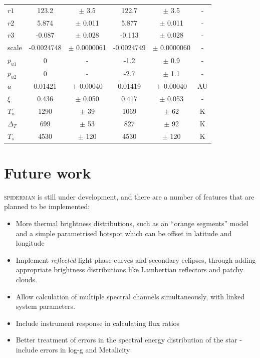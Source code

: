 \documentclass[a4paper,fleqn,usenatbib]{mnras}
\begin{document}
\begin{center}
\begin{table}
{\begin{center}
\begin{tabular}{l c c c c c}
$r1$ &        123.2 & $\pm$         3.5 &        122.7 & $\pm$         3.5 & -\\
$r2$ &        5.874 & $\pm$       0.011 &        5.877 & $\pm$       0.011 & -\\
$r3$ &       -0.087 & $\pm$       0.028 &       -0.113 & $\pm$       0.028 & -\\
scale &   -0.0024748 & $\pm$   0.0000061 &   -0.0024749 & $\pm$   0.0000060 & -\\
$p_{u1}$ & 0 & - &         -1.2 & $\pm$         0.9 & -\\
$p_{u2}$ & 0 & - &         -2.7 & $\pm$         1.1 & -\\
$a$ &      0.01421 & $\pm$     0.00040 &      0.01419 & $\pm$     0.00040 & AU\\
$\xi$ &        0.436 & $\pm$       0.050 &        0.417 & $\pm$       0.053 & -\\
$T_n$ &         1290 & $\pm$          39 &         1069 & $\pm$          62 & K\\
$\Delta_T$ &          699 & $\pm$          53 &          827 & $\pm$          92 & K\\
$T_s$ &         4530 & $\pm$         120 &         4530 & $\pm$         120 & K\\
\end{tabular}
\end{center}
\label{tab:results}
}
\end{table}
\end{center}

\section{Future work}\label{sec:future work}

\textsc{spiderman} is still under development, and there are a number of features that are planned to be implemented:

\begin{itemize}
\item More thermal brightness distributions, such as an ``orange segments'' model and a simple parametrised hotspot which can be offset in latitude and longitude
\item Implement \emph{reflected} light phase curves and secondary eclipses, through adding appropriate brightness distributions like Lambertian reflectors and patchy clouds.
\item Allow calculation of multiple spectral channels simultaneously, with linked system parameters.
\item Include instrument response in calculating flux ratios
\item Better treatment of errors in the spectral energy distribution of the star - include errors in log-g and Metalicity
\end{itemize}
\end{document}
